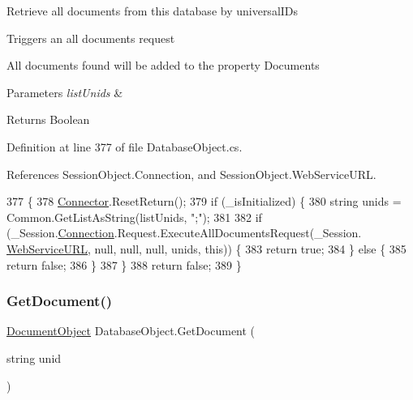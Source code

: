 Retrieve all documents from this database by universal\+I\+Ds 

Triggers an all documents request

All documents found will be added to the property \textquotesingle{}Documents\textquotesingle{}


\begin{DoxyParams}{Parameters}
{\em list\+Unids} & \\
\hline
\end{DoxyParams}
\begin{DoxyReturn}{Returns}
Boolean
\end{DoxyReturn}


Definition at line 377 of file Database\+Object.\+cs.



References Session\+Object.\+Connection, and Session\+Object.\+Web\+Service\+U\+RL.


\begin{DoxyCode}
377                                                         \{
378         \hyperlink{class_connector}{Connector}.ResetReturn();
379         \textcolor{keywordflow}{if} (\_isInitialized) \{
380             \textcolor{keywordtype}{string} unids = Common.GetListAsString(listUnids, \textcolor{stringliteral}{";"});
381 
382             \textcolor{keywordflow}{if} (\_Session.\hyperlink{class_session_object_a014bdbf705a753540e19bfb53030c55c}{Connection}.Request.ExecuteAllDocumentsRequest(\_Session.
      \hyperlink{class_session_object_a697c071c812fbf7ad1166b896fb44c16}{WebServiceURL}, null, null, null, unids, \textcolor{keyword}{this})) \{
383                 \textcolor{keywordflow}{return} \textcolor{keyword}{true};
384             \} \textcolor{keywordflow}{else} \{
385                 \textcolor{keywordflow}{return} \textcolor{keyword}{false};
386             \}
387         \}
388         \textcolor{keywordflow}{return} \textcolor{keyword}{false};
389     \}
\end{DoxyCode}
\mbox{\label{class_database_object_a9435cc20fe3a92747e509011b7726aff}} 
\subsubsection{\texorpdfstring{Get\+Document()}{GetDocument()}}
{\footnotesize\ttfamily \hyperlink{class_document_object}{Document\+Object} Database\+Object.\+Get\+Document (\begin{DoxyParamCaption}\item[{string}]{unid }\end{DoxyParamCaption})}




